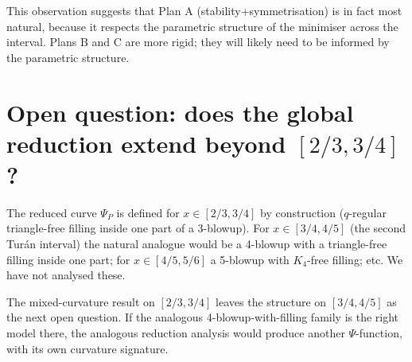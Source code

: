 \documentclass[11pt]{amsart}
\theoremstyle{definition}
\begin{document}
This observation suggests that Plan A (stability+symmetrisation) is in fact
most natural, because it respects the parametric structure of the minimiser
across the interval.  Plans B and C are more rigid; they will likely need to
be informed by the parametric structure.

\section{Open question: does the global reduction extend beyond $[2/3,3/4]$?}

The reduced curve $\Psi_P$ is defined for $x\in[2/3,3/4]$ by construction
($q$-regular triangle-free filling inside one part of a 3-blowup).  For
$x\in[3/4,4/5]$ (the second Turán interval) the natural analogue would be a
4-blowup with a triangle-free filling inside one part; for $x\in[4/5,5/6]$
a 5-blowup with $K_4$-free filling; etc.  We have not analysed these.

The mixed-curvature result on $[2/3,3/4]$ leaves the structure on
$[3/4,4/5]$ as the next open question.  If the analogous 4-blowup-with-filling
family is the right model there, the analogous reduction analysis would
produce another $\Psi$-function, with its own curvature signature.
\end{document}
